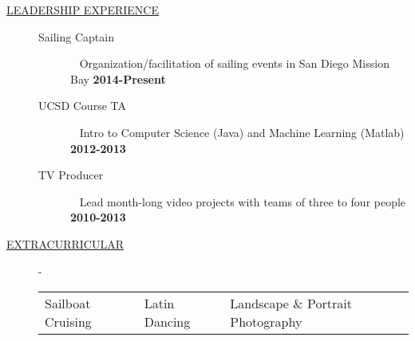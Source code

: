 \documentclass[12pt]{article}
\begin{document}
\begin{description}
    \fi

    \item[\underline{LEADERSHIP EXPERIENCE}] \hfill
        \begin{description}
            \item[Sailing Captain] \textbullet ~ Organization/facilitation of sailing events in San Diego Mission Bay \hfill \textbf{2014-Present}
            \item[UCSD Course TA]
                \textbullet ~ Intro to Computer Science (Java) and Machine Learning (Matlab)    \hfill \textbf{2012-2013}
            \item[TV Producer] \textbullet ~ Lead month-long video projects with teams of three to four people \hfill \textbf{2010-2013}
        \end{description}

    \item[\underline{EXTRACURRICULAR}] -
        \begin{tabular}{l|l|l}
            Sailboat Cruising & Latin Dancing & Landscape \& Portrait Photography
        \end{tabular}

    \iffalse
    \item[\underline{REFERENCES}] - Available upon request
    \fi 

\end{description}
\end{document}

